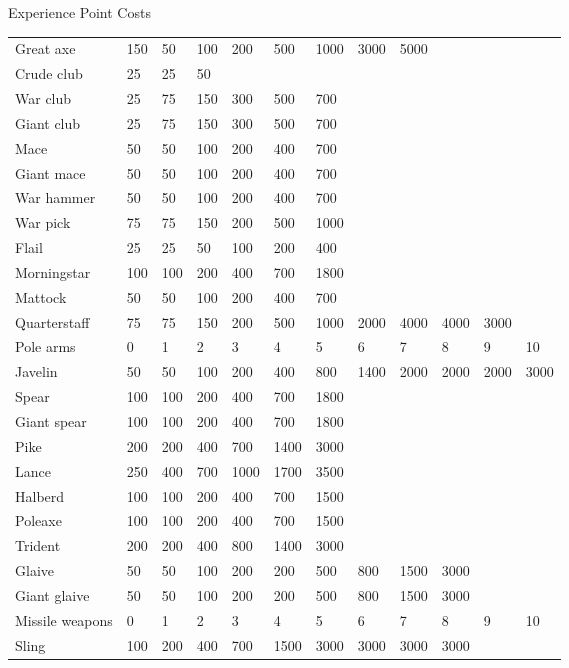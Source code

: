 \begin{Tables}{Experience Point Costs}
\begin{tabularx}{\linewidth}{Xlllllllllll}
Great axe		& 150	& 50 	& 100	& 200	& 500	& 1000	& 3000	& 5000	& 	& 	&  \\
Crude club		& 25	& 25 	& 50	& 	& 	& 	& 	& 	& 	& 	&  \\
War club		& 25	& 75 	& 150	& 300	& 500	& 700	& 	& 	& 	& 	&  \\
Giant club		& 25	& 75 	& 150	& 300	& 500	& 700	& 	& 	& 	& 	&  \\
Mace			& 50	& 50 	& 100	& 200	& 400	& 700	& 	& 	& 	& 	&  \\
Giant mace		& 50	& 50 	& 100	& 200	& 400	& 700	& 	& 	& 	& 	&  \\
War hammer		& 50	& 50 	& 100	& 200	& 400	& 700	& 	& 	& 	& 	&  \\
War pick		& 75	& 75 	& 150	& 200	& 500	& 1000	& 	& 	& 	& 	&  \\
Flail			& 25	& 25 	& 50	& 100	& 200	& 400	& 	& 	& 	& 	&  \\
Morningstar		& 100	& 100 	& 200	& 400	& 700	& 1800	& 	& 	& 	& 	&  \\
Mattock			& 50	& 50 	& 100	& 200	& 400	& 700	& 	& 	& 	& 	&  \\
Quarterstaff		& 75	& 75 	& 150	& 200	& 500	& 1000	& 2000	& 4000	& 4000	& 3000	&  \\ \hline
Pole arms		& 0	& 1 	& 2	& 3	& 4	& 5	& 6	& 7	& 8	& 9	& 10 \\ \hline
Javelin			& 50	& 50 	& 100	& 200	& 400	& 800	& 1400	& 2000	& 2000	& 2000	& 3000 \\
Spear			& 100	& 100 	& 200	& 400	& 700	& 1800	& 	& 	& 	& 	&  \\
Giant spear		& 100	& 100 	& 200	& 400	& 700	& 1800	& 	& 	& 	& 	&  \\
Pike			& 200	& 200 	& 400	& 700	& 1400	& 3000	& 	& 	& 	& 	&  \\
Lance			& 250	& 400 	& 700	& 1000	& 1700	& 3500	& 	& 	& 	& 	&  \\
Halberd			& 100	& 100 	& 200	& 400	& 700	& 1500	& 	& 	& 	& 	&  \\
Poleaxe			& 100	& 100 	& 200	& 400	& 700	& 1500	& 	& 	& 	& 	&  \\
Trident			& 200	& 200 	& 400	& 800 	& 1400	& 3000	& 	& 	& 	& 	&  \\
Glaive			& 50	& 50	& 100	& 200	& 200	& 500	& 800	& 1500	& 3000	& 	&  \\
Giant glaive		& 50	& 50	& 100	& 200	& 200	& 500	& 800	& 1500	& 3000	& 	&  \\ \hline
Missile weapons		& 0	& 1 	& 2	& 3	& 4	& 5	& 6	& 7	& 8	& 9	& 10 \\ \hline
Sling			& 100	& 200 	& 400	& 700	& 1500	& 3000	& 3000	& 3000	& 3000	& 	&  \\

\end{tabularx}
\end{Tables}
